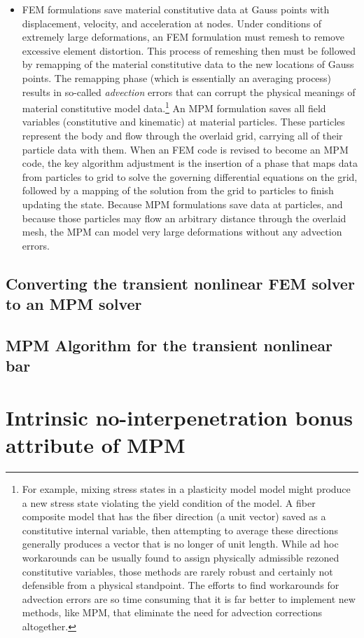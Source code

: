 \begin{itemize}
\item FEM formulations save material constitutive data at Gauss points with displacement, velocity, and acceleration at nodes.  Under conditions of extremely large deformations, an FEM formulation must remesh to remove excessive element distortion. This process of remeshing then must be followed by remapping of the material constitutive data to the new locations of Gauss points. The remapping phase (which is essentially an averaging process) results in so-called \emph{advection} errors that can corrupt the physical meanings of material constitutive model data.\footnote{For example, mixing stress states in a plasticity model model might produce a new stress state violating the yield condition of the model. A fiber composite model that has the fiber direction (a unit vector) saved as a constitutive internal variable, then attempting to average these directions generally produces a vector that is no longer of unit length. While ad hoc workarounds can be usually found to assign physically admissible rezoned constitutive variables, those methods are rarely robust and certainly not defensible from a physical standpoint. The efforts to find workarounds for advection errors are so time consuming that it is far better to implement new methods, like MPM, that eliminate the need for advection corrections altogether.}  An MPM formulation saves all field variables (constitutive and kinematic) at material particles. These particles represent the body and flow through the overlaid grid, carrying all of their particle data with them. When an FEM code is revised to become an MPM code, the key algorithm adjustment is the insertion of a phase that maps data from particles to grid to solve the governing differential equations on the grid, followed by a mapping of the solution from the grid to particles to finish updating the state.  Because MPM formulations save data at particles, and because those particles may flow an arbitrary distance through the overlaid mesh, the MPM can model very large deformations without any advection errors. 
\end{itemize}



\subsection{Converting the \twoD transient nonlinear FEM solver to an MPM solver}
\subsection{MPM Algorithm for the \twoD transient nonlinear bar}

\section{Intrinsic no-interpenetration bonus attribute of MPM}
